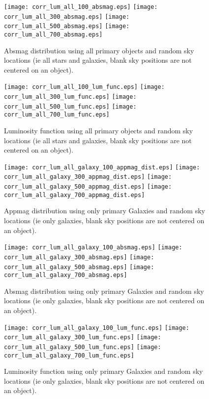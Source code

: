 \documentclass[10pt]{article}
\begin{document}
\begin{figure}
 \texttt{[image: corr\_lum\_all\_100\_absmag.eps]}
 \texttt{[image: corr\_lum\_all\_300\_absmag.eps]}
 \texttt{[image: corr\_lum\_all\_500\_absmag.eps]}
 \texttt{[image: corr\_lum\_all\_700\_absmag.eps]}
\caption{Absmag distribution using all primary objects and random sky locations 
(ie all stars and galaxies, blank sky positions are not centered on an object).}
\end{figure}

\begin{figure}
 \texttt{[image: corr\_lum\_all\_100\_lum\_func.eps]}
 \texttt{[image: corr\_lum\_all\_300\_lum\_func.eps]}
 \texttt{[image: corr\_lum\_all\_500\_lum\_func.eps]}
 \texttt{[image: corr\_lum\_all\_700\_lum\_func.eps]}
\caption{Luminosity function using all primary objects and random sky locations 
(ie all stars and galaxies, blank sky positions are not centered on an object).}
\end{figure}

\begin{figure}
 \texttt{[image: corr\_lum\_all\_galaxy\_100\_appmag\_dist.eps]}
 \texttt{[image: corr\_lum\_all\_galaxy\_300\_appmag\_dist.eps]}
 \texttt{[image: corr\_lum\_all\_galaxy\_500\_appmag\_dist.eps]}
 \texttt{[image: corr\_lum\_all\_galaxy\_700\_appmag\_dist.eps]}
\caption{Appmag distribution using only primary Galaxies and random sky locations 
(ie only galaxies, blank sky positions are not centered on an object).}
\end{figure}

\begin{figure}
 \texttt{[image: corr\_lum\_all\_galaxy\_100\_absmag.eps]}
 \texttt{[image: corr\_lum\_all\_galaxy\_300\_absmag.eps]}
 \texttt{[image: corr\_lum\_all\_galaxy\_500\_absmag.eps]}
 \texttt{[image: corr\_lum\_all\_galaxy\_700\_absmag.eps]}
\caption{Absmag distribution using only primary Galaxies and random sky locations 
(ie only galaxies, blank sky positions are not centered on an object).}
\end{figure}

\begin{figure}
 \texttt{[image: corr\_lum\_all\_galaxy\_100\_lum\_func.eps]}
 \texttt{[image: corr\_lum\_all\_galaxy\_300\_lum\_func.eps]}
 \texttt{[image: corr\_lum\_all\_galaxy\_500\_lum\_func.eps]}
 \texttt{[image: corr\_lum\_all\_galaxy\_700\_lum\_func.eps]}
\caption{Luminosity function using only primary Galaxies and random sky locations 
(ie only galaxies, blank sky positions are not centered on an object).}
\end{figure}
\end{document}
